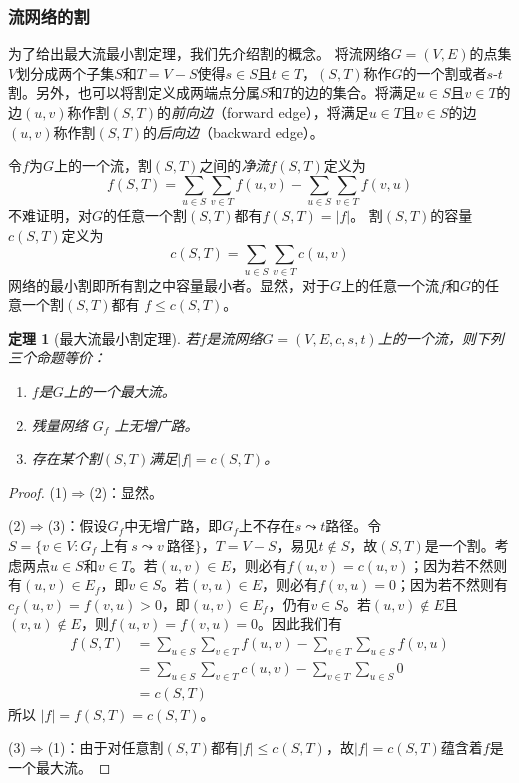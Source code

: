 \documentclass[a4paper]{ctexbook}
\newtheorem{theorem}{定理}[chapter] %
\begin{document}
  \subsubsection*{流网络的割}
  为了给出最大流最小割定理，我们先介绍割的概念。
  将流网络$G=(V,E)$的点集$V$划分成两个子集$S$和$T=V-S$使得$s\in S$且$t\in T$，$(S,T)$称作$G$的一个割或者$s$-$t$割。另外，也可以将割定义成两端点分属$S$和$T$的边的集合。将满足$u\in S$且$v\in T$的边$(u,v)$称作割$(S,T)$的\emph{前向边}（forward edge），将满足$u\in T$且$v\in S$的边$(u,v)$称作割$(S,T)$的\emph{后向边}（backward edge）。

  令$f$为$G$上的一个流，割$(S,T)$之间的\emph{净流}$f(S,T)$定义为
  \[
  f(S,T) = \sum_{u\in S}\sum_{v\in T}f(u,v) - \sum_{u\in S}\sum_{v\in T}f(v,u)
  \]
  不难证明，对$G$的任意一个割$(S,T)$都有$f(S,T) = |f|$。
  割$(S,T)$的容量$c(S,T)$定义为
  \[
  c(S,T) = \sum_{u\in S}\sum_{v\in T}c(u,v)
  \]
  网络的最小割即所有割之中容量最小者。显然，对于$G$上的任意一个流$f$和$G$的任意一个割$(S,T)$都有 $f \le c(S,T)$。
  \begin{theorem}[最大流最小割定理]
    若$f$是流网络$G=(V,E,c,s,t)$上的一个流，则下列三个命题等价：
    \begin{enumerate}
      \item $f$是$G$上的一个最大流。
      \item 残量网络 $G_f$ 上无增广路。
      \item 存在某个割$(S,T)$满足$|f| = c(S,T)$。
    \end{enumerate}
  \end{theorem}
  \begin{proof}
    (1)$\Rightarrow$(2)：显然。

    (2)$\Rightarrow$(3)：假设$G_f$中无增广路，即$G_f$上不存在$s\leadsto t$路径。令$S=\{v\in V\colon G_f\ \text{上有}\ s\leadsto v\ \text{路径}\}$，$T=V-S$，易见$t\notin S$，故$(S,T)$是一个割。考虑两点$u\in S$和$v\in T$。若$(u,v)\in E$，则必有$f(u,v)=c(u,v)$；因为若不然则有$(u,v)\in E_f$，即$v\in S$。若$(v,u)\in E$，则必有$f(v,u)=0$；因为若不然则有$c_f(u,v) = f(v,u) > 0$，即$(u,v)\in E_f$，仍有$v \in S$。若$(u,v)\notin E$且$(v,u)\notin E$，则$f(u,v)=f(v,u)=0$。因此我们有
    \begin{align*}
        f(S,T) &= \sum_{u\in S}\sum_{v\in T}f(u,v) - \sum_{v\in T}\sum_{u\in S}f(v,u)\\
        &= \sum_{u\in S}\sum_{v\in T}c(u,v) - \sum_{v\in T}\sum_{u\in S}0\\
        &= c(S, T)
    \end{align*}
    所以 $|f| = f(S,T) = c(S, T)$。

    (3)$\Rightarrow$(1)：由于对任意割$(S,T)$都有$|f|\le c(S,T)$，故$|f|=c(S,T)$蕴含着$f$是一个最大流。
  \end{proof}
\end{document}

